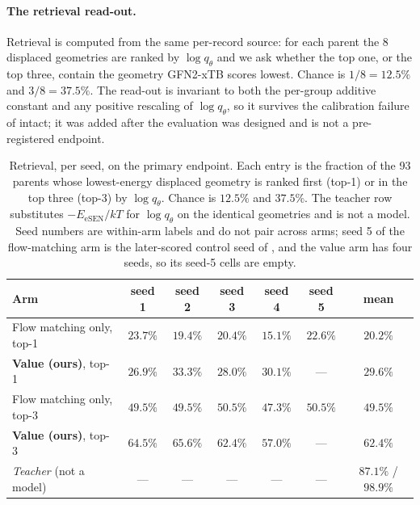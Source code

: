 \paragraph{The retrieval read-out.} Retrieval is computed from the same per-record
source: for each parent the 8 displaced geometries are ranked by $\log q_\theta$ and
we ask whether the top one, or the top three, contain the geometry GFN2-xTB scores
lowest. Chance is $1/8 = 12.5\%$ and $3/8 = 37.5\%$. The read-out is invariant to
both the per-group additive constant and any positive rescaling of $\log q_\theta$,
so it survives the calibration failure of  intact; it was added after
the evaluation was designed and is not a pre-registered endpoint.

\begin{table}[h]
\caption{Retrieval, per seed, on the primary endpoint. Each entry is the fraction of
the 93 parents whose lowest-energy displaced geometry is ranked first (top-1) or in
the top three (top-3) by $\log q_\theta$. Chance is $12.5\%$ and $37.5\%$. The
teacher row substitutes $-E_{\mathrm{eSEN}}/kT$ for $\log q_\theta$ on the identical
geometries and is not a model. Seed numbers are within-arm labels and do not pair
across arms; seed 5 of the flow-matching arm is the later-scored control seed of
, and the value arm has four seeds, so its seed-5 cells are empty.}
\label{tab:retrieval}
\begin{center}
\footnotesize
\begin{tabular}{lcccccc}
\toprule
Arm & seed 1 & seed 2 & seed 3 & seed 4 & seed 5 & mean \\
\midrule
Flow matching only, top-1 & $23.7\%$ & $19.4\%$ & $20.4\%$ & $15.1\%$ & $22.6\%$ & $20.2\%$ \\
\textbf{Value (ours)}, top-1 & $26.9\%$ & $33.3\%$ & $28.0\%$ & $30.1\%$ & --- & $\mathbf{29.6\%}$ \\
\midrule
Flow matching only, top-3 & $49.5\%$ & $49.5\%$ & $50.5\%$ & $47.3\%$ & $50.5\%$ & $49.5\%$ \\
\textbf{Value (ours)}, top-3 & $64.5\%$ & $65.6\%$ & $62.4\%$ & $57.0\%$ & --- & $\mathbf{62.4\%}$ \\
\midrule
\emph{Teacher} (not a model) & --- & --- & --- & --- & --- & $87.1\%$ / $98.9\%$ \\
\bottomrule
\end{tabular}
\end{center}
\end{table}

